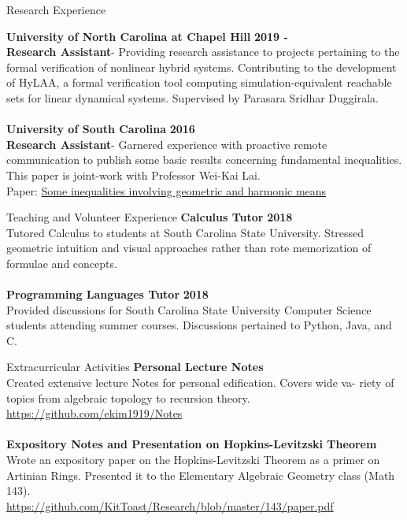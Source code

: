 \documentclass{resume} %
\begin{document}
\begin{rSection}{Research Experience}

{\bf University of North Carolina at Chapel Hill} \hfill {\bf 2019 -} \\
{\bf Research Assistant}- Providing research assistance to projects pertaining to the formal verification of nonlinear hybrid systems. Contributing to the development of HyLAA, a formal verification tool computing simulation-equivalent reachable sets for linear dynamical systems. Supervised by Parasara Sridhar Duggirala. \\
\\
{\bf University of South Carolina} \hfill {\bf 2016} \\
{\bf Research Assistant}- Garnered experience with proactive remote communication to publish some basic results concerning fundamental inequalities. This paper is joint-work with Professor Wei-Kai Lai.\\
Paper: \href{http://www.m-hikari.com/imf/imf-2016/1-4-2016/51190.html}{Some inequalities involving geometric and harmonic means}
\end{rSection}


\begin{rSection}{Teaching and Volunteer Experience}
{\bf Calculus Tutor} \hfill {\bf 2018} \\
Tutored Calculus to students at South Carolina State University. Stressed geometric intuition and visual approaches rather than rote memorization of formulae and concepts. \\
\\
{\bf Programming Languages Tutor} \hfill {\bf 2018} \\
Provided discussions for South Carolina State University Computer Science students attending summer courses. Discussions pertained to Python, Java, and C. \\
\end{rSection}
\newpage
\begin{rSection}{Extracurricular Activities}
{\bf Personal Lecture Notes} \hfill \\
Created extensive lecture Notes for personal edification. Covers wide va- riety of topics from algebraic topology to recursion theory. \\ \url{https://github.com/ekim1919/Notes} \\
\\
{\bf Expository Notes and Presentation on Hopkins-Levitzski Theorem} \hfill \\
Wrote an expository paper on the Hopkins-Levitzski Theorem as a primer on Artinian Rings. Presented it to the Elementary Algebraic Geometry class (Math 143). \\
\url{https://github.com/KitToast/Research/blob/master/143/paper.pdf}
\end{rSection}
\end{document}
